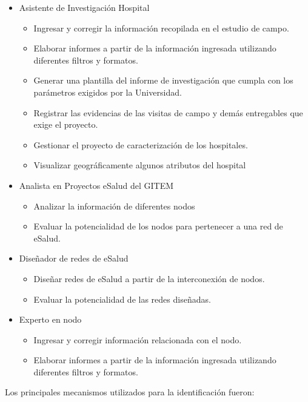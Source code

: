 \begin{itemize}
 \item Asistente de Investigación Hospital
    \begin{itemize}
    \item Ingresar y corregir la información recopilada en el estudio de campo.
    \item Elaborar informes a partir de la información ingresada utilizando diferentes filtros y formatos.
    \item Generar una plantilla del informe de investigación que cumpla con los parámetros exigidos por la Universidad.
    \item Registrar las evidencias de las visitas de campo y demás entregables que exige el proyecto.
    \item Gestionar el proyecto de caracterización de los hospitales.
    \item Visualizar geográficamente algunos atributos del hospital
    \end{itemize}
  \item Analista en Proyectos eSalud del GITEM 
    \begin{itemize}
    \item Analizar la información de diferentes nodos
    \item Evaluar la potencialidad de los nodos para pertenecer a una red de eSalud.
    \end{itemize}
  \item Diseñador de redes de eSalud
    \begin{itemize}
    \item Diseñar redes de eSalud a partir de la interconexión de nodos.
    \item Evaluar la potencialidad de las redes diseñadas.
    \end{itemize}
  \item Experto en nodo
  \begin{itemize}
    \item Ingresar y corregir información relacionada con el nodo.
    \item Elaborar informes a partir de la información ingresada utilizando diferentes filtros y formatos.
  \end{itemize}
\end{itemize}

Los principales mecanismos utilizados para la identificación fueron:

